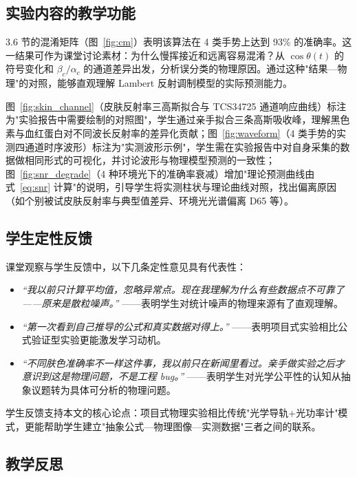 \documentclass[11pt,a4paper]{ctexart}
\begin{document}
\subsection{实验内容的教学功能}
\label{sec:results_discussion}

3.6 节的混淆矩阵（图~\ref{fig:cm}）表明该算法在 4 类手势上达到 93\% 的准确率。这一结果可作为课堂讨论素材：为什么慢挥接近和远离容易混淆？从 $\cos\theta(t)$ 的符号变化和 $\beta_c/\alpha_c$ 的通道差异出发，分析误分类的物理原因。通过这种"结果—物理"的对照，能够直观理解 Lambert 反射调制模型的实际预测能力。

图~\ref{fig:skin_channel}（皮肤反射率三高斯拟合与 TCS34725 通道响应曲线）标注为"实验报告中需要绘制的对照图"，学生通过亲手拟合三条高斯吸收峰，理解黑色素与血红蛋白对不同波长反射率的差异化贡献；图~\ref{fig:waveform}（4 类手势的实测四通道时序波形）标注为"实测波形示例"，学生需在实验报告中对自身采集的数据做相同形式的可视化，并讨论波形与物理模型预测的一致性；图~\ref{fig:snr_degrade}（4 种环境光下的准确率衰减）增加"理论预测曲线由式~\eqref{eq:snr} 计算"的说明，引导学生将实测柱状与理论曲线对照，找出偏离原因（如个别被试皮肤反射率与典型值差异、环境光光谱偏离 D65 等）。

\subsection{学生定性反馈}
\label{sec:results_feedback}

课堂观察与学生反馈中，以下几条定性意见具有代表性：
\begin{itemize}[leftmargin=1.5em]
  \item \textit{``我以前只计算平均值，忽略异常点。现在我理解为什么有些数据点不可靠了——原来是散粒噪声。''} ——表明学生对统计噪声的物理来源有了直观理解。
  \item \textit{``第一次看到自己推导的公式和真实数据对得上。''} ——表明项目式实验相比公式验证型实验更能激发学习动机。
  \item \textit{``不同肤色准确率不一样这件事，我以前只在新闻里看过。亲手做实验之后才意识到这是物理问题，不是工程 bug。''} ——表明学生对光学公平性的认知从抽象议题转为具体可分析的物理问题。
\end{itemize}
学生反馈支持本文的核心论点：项目式物理实验相比传统"光学导轨+光功率计"模式，更能帮助学生建立"抽象公式—物理图像—实测数据"三者之间的联系。

\subsection{教学反思}
\label{sec:results_reflection}
\end{document}
